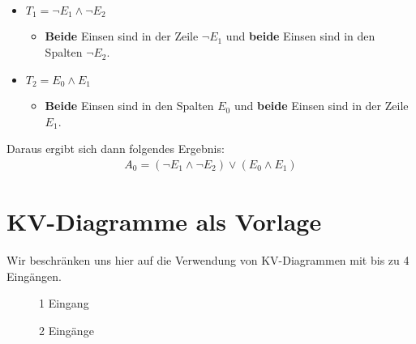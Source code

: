 \begin{example}
\begin{itemize}
\item $T_1 = \neg E_1 \wedge \neg E_2$
\begin{itemize}
\item \textbf{Beide} Einsen sind in der Zeile $\neg E_1$ und \textbf{beide} Einsen sind in den Spalten $\neg E_2$.
\end{itemize}
\item $T_2 = E_0 \wedge E_1$
\begin{itemize}
\item \textbf{Beide} Einsen sind in den Spalten $E_0$ und \textbf{beide} Einsen sind in der Zeile $E_1$.
\end{itemize}
\end{itemize}

Daraus ergibt sich dann folgendes Ergebnis:
\begin{align*}
A_0 = (\neg E_1 \wedge \neg E_2) \vee (E_0 \wedge E_1)
\end{align*}

\end{example}

\section{\acs{KV}-Diagramme als Vorlage}

Wir beschränken uns hier auf die Verwendung von \ac{KV}-Diagrammen mit bis zu \num{4} Eingängen.

\begin{figure}[htb]
\centering
\begin{minipage}{0.45\textwidth}
\centering
{}
\caption{\num{1} Eingang}
\label{figure-kv-diagramm-e-1}
\end{minipage}
\hfill
\begin{minipage}{0.45\textwidth}
\centering
{}
\caption{\num{2} Eingänge}
\label{figure-kv-diagramm-e-2}
\end{minipage}
\end{figure}

